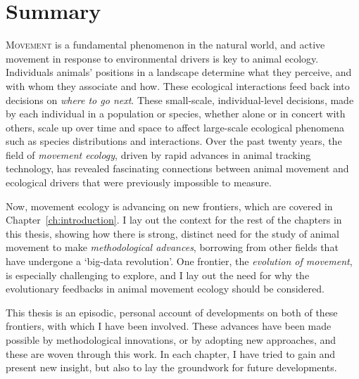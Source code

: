 \begingroup
\chapter*{Summary}


\lettrine{M}{ovement} is a fundamental phenomenon in the natural world, and active movement in response to environmental drivers is key to animal ecology.
Individuals animals' positions in a landscape determine what they perceive, and with whom they associate and how.
These ecological interactions feed back into decisions on \textit{where to go next}.
These small-scale, individual-level decisions, made by each individual in a population or species, whether alone or in concert with others, scale up over time and space to affect large-scale ecological phenomena such as species distributions and interactions.
Over the past twenty years, the field of \textit{movement ecology}, driven by rapid advances in animal tracking technology, has revealed fascinating connections between animal movement and ecological drivers that were previously impossible to measure.

\medskip

\noindent Now, movement ecology is advancing on new frontiers, which are covered in Chapter~\ref{ch:introduction}.
I lay out the context for the rest of the chapters in this thesis, showing how there is strong, distinct need for the study of animal movement to make \textit{methodological advances}, borrowing from other fields that have undergone a `big-data revolution'.
One frontier, the \textit{evolution of movement}, is especially challenging to explore, and I lay out the need for why the evolutionary feedbacks in animal movement ecology should be considered.

\medskip

\noindent This thesis is an episodic, personal account of developments on both of these frontiers, with which I have been involved.
These advances have been made possible by methodological innovations, or by adopting new approaches, and these are woven through this work. 
In each chapter, I have tried to gain and present new insight, but also to lay the groundwork for future developments.


